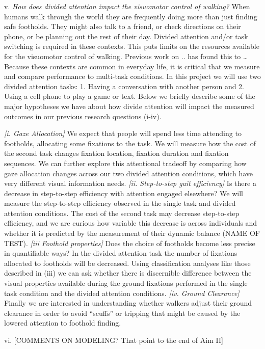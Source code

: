 v. \emph{How does divided attention impact the visuomotor control of walking?} When humans walk through the world they are frequently doing more than just finding safe footholds. They might also talk to a friend, or check directions on their phone, or be planning out the rest of their day. Divided attention and/or task switching is required in these contexts. This puts limits on the resources available for the visuomotor control of walking. Previous work on .. has found this to \ldots{} Because these contexts are common in everyday life, it is critical that we measure and compare performance to multi-task conditions. In this project we will use two divided attention tasks: 1. Having a conversation with another person and 2. Using a cell phone to play a game or text. Below we briefly describe some of the major hypotheses we have about how divide attention will impact the measured outcomes in our previous research questions (i-iv). 

\emph{[i. Gaze Allocation]} We expect that people will spend less time attending to footholds, allocating some fixations to the task. We will measure how the cost of the second task changes fixation location, fixation duration and fixation sequences. We can further explore this attentional tradeoff by comparing how gaze allocation changes across our two divided attention conditions, which have very different visual information needs. \emph{[ii. Step-to-step gait efficiency]} Is there a decrease in step-to-step efficiency with attention engaged elsewhere? We will measure the step-to-step efficiency observed in the
single task and divided attention conditions. The cost of the second task may decrease step-to-step efficiency, and we are curious how variable this decrease is across individuals and whether it is predicted by the measurement of their dynamic balance (NAME OF TEST). \emph{[iii Foothold properties]} Does the choice of footholds become less precise in quantifiable ways? In the divided attention task the number of fixations allocated to footholds will be decreased. Using classification analyses like those described in (iii) we can ask whether there is discernible difference between the visual properties available during the ground fixations performed in the single task condition and the divided attention conditions. \emph{[iv. Ground Clearance]} Finally we are interested in understanding whether walkers adjust their ground clearance in order to avoid ``scuffs'' or tripping that might be caused by the lowered attention to foothold finding.

vi. [COMMENTS ON MODELING? That point to the end of Aim II]

